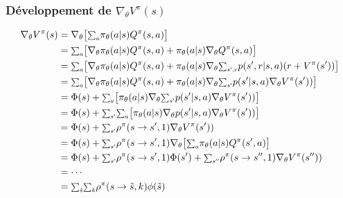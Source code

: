 \documentclass[8pt]{beamer}
\begin{document}
\begin{frame}[label=demopolicygradient]
  \frametitle{Développement de $\nabla_{\theta} V^{\pi}(s)$}

  
    \begin{align*}
      \nabla_{\theta}V^{\pi}(s) &= \nabla_{\theta} \big[ {\scalebox{0.85}{$\sum_a$}} \pi_{\theta}(a|s)Q^{\pi}(s,a) \big] \\
      &= {\scalebox{0.85}{$\sum_a$}} \big[\nabla_{\theta}\pi_{\theta}(a|s)Q^{\pi}(s,a) + \pi_{\theta}(a|s) \nabla_{\theta} Q^{\pi}(s,a) \big] \\
      &= {\scalebox{0.85}{$\sum_a$}} \big[\nabla_{\theta}\pi_{\theta}(a|s)Q^{\pi}(s,a) + \pi_{\theta}(a|s) \nabla_{\theta} {\scalebox{0.85}{$\sum_{s',r}$}}p(s', r |s,a)(r+V^{\pi}(s')) \big] \\
      &= {\scalebox{0.85}{$\sum_a$}} \big[\nabla_{\theta}\pi_{\theta}(a|s)Q^{\pi}(s,a) + \pi_{\theta}(a|s) \nabla_{\theta} {\scalebox{0.85}{$\sum_{s'}$}}p(s'|s,a)\nabla_{\theta}V^{\pi}(s')) \big] \\
      &= \Phi(s) + {\scalebox{0.85}{$\sum_a$}} \big[\pi_{\theta}(a|s) \nabla_{\theta} {\scalebox{0.85}{$\sum_{s'}$}}p(s'|s,a)\nabla_{\theta}V^{\pi}(s')) \big] \\
      &= \Phi(s) + {\scalebox{0.85}{$\sum_{s'}$}}{\scalebox{0.85}{$\sum_a$}} \big[\pi_{\theta}(a|s) \nabla_{\theta} p(s'|s,a)\nabla_{\theta}V^{\pi}(s')) \big] \\
      &= \Phi(s) + {\scalebox{0.85}{$\sum_{s'}$}}\rho^{\pi}(s\rightarrow s', 1)\nabla_{\theta}V^{\pi}(s')) \\
      &= \Phi(s) + {\scalebox{0.85}{$\sum_{s'}$}}\rho^{\pi}(s\rightarrow s', 1)\nabla_{\theta} \big[ {\scalebox{0.85}{$\sum_a$}} \pi_{\theta}(a|s)Q^{\pi}(s',a) \big] \\
      &= \Phi(s) + {\scalebox{0.85}{$\sum_{s'}$}}\rho^{\pi}(s\rightarrow s', 1)\Phi(s') + {\scalebox{0.85}{$\sum_{s''}$}}\rho^{\pi}(s\rightarrow s'', 1)\nabla_{\theta}V^{\pi}(s'')) \\
      &= \cdots \\
      &= {\scalebox{0.85}{$\sum_{\tilde s}$}}{\scalebox{0.85}{$\sum_{k}$}}\rho^{\pi}(s \rightarrow \tilde s, k)\phi(\tilde s)
    \end{align*}

\end{frame}
\end{document}

